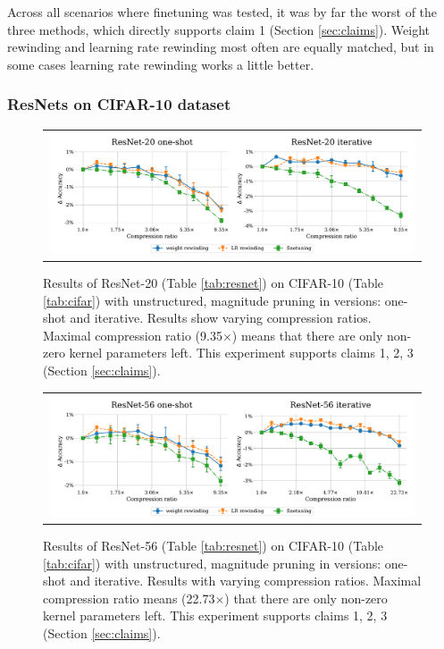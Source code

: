 Across all scenarios where finetuning was tested, it was by far the worst of the three methods, which directly supports claim 1 (Section \ref{sec:claims}). Weight rewinding and learning rate rewinding most often are equally matched, but in some cases learning rate rewinding works a little better.

\subsubsection{ResNets on CIFAR-10 dataset}

\nopagebreak

\begin{figure}[H]
\centering
\setlength{\tabcolsep}{0pt}
\begin{tabular}{c}
\includegraphics[width=1.0\linewidth]{pics/Resnet20-1s-iterative.pdf}
\end{tabular}
\caption{Results of ResNet-20 (Table \ref{tab:resnet}) on CIFAR-10 (Table \ref{tab:cifar}) with unstructured, magnitude pruning in versions: one-shot and iterative. Results show varying compression ratios. Maximal compression ratio (9.35$\times$) means that there are only  non-zero kernel parameters left. This experiment supports claims 1, 2, 3 (Section \ref{sec:claims}).}
\label{fig:resnet20-1}
\end{figure}

\begin{figure}[H]
\setlength{\tabcolsep}{0pt}
\centering
    \begin{tabular}{c}
      \includegraphics[width=1.0\linewidth]{pics/Resnet56-1s-iterative.pdf}
    \end{tabular}
\caption{Results of ResNet-56 (Table \ref{tab:resnet}) on CIFAR-10 (Table \ref{tab:cifar}) with unstructured, magnitude pruning in versions: one-shot and iterative. Results with varying compression ratios. Maximal compression ratio means (22.73$\times$) that there are only  non-zero kernel parameters left. This experiment supports claims 1, 2, 3 (Section \ref{sec:claims}).}
\label{fig:resnet56}
\end{figure}

